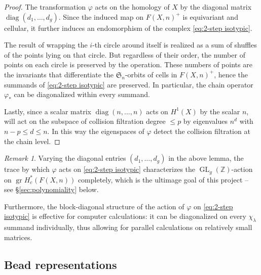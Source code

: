 \documentclass[12pt]{article}
\newcommand{\Z}{\mathbb{Z}}
\newcommand{\SymGroup}[1][n]{\mathfrak{S}_{#1}}
\newcommand{\Specht}[1]{\chi_{#1}}
\DeclareMathOperator{\GL}{GL}
\DeclareMathOperator{\gr}{gr}
\theoremstyle{plain}
\theoremstyle{definition}
\theoremstyle{remark}
\newtheorem{rmk}[thm]{Remark}
\begin{document}
\begin{proof}
    The transformation $\varphi$ acts on the homology of $X$ by the diagonal matrix $\operatorname{diag}(d_1,\ldots,d_g)$.
    Since the induced map on $F(X,n)^+$ is equivariant and cellular, it further induces an endomorphism of the complex \eqref{eq:2-step isotypic}.
    
    The result of wrapping the $i$-th circle around itself is realized as a sum of shuffles of the points lying on that circle. But regardless of their order, the number of points on each circle is preserved by the operation. These numbers of points are the invariants that differentiate the $\SymGroup$-orbits of cells in $F(X,n)^+$, hence the summands of \eqref{eq:2-step isotypic} are preserved. In particular, the chain operator $\varphi_*$ can be diagonalized within every summand.
    
    Lastly, since a scalar matrix $\operatorname{diag}(n,\ldots,n)$ acts on $H^1(X)$ by the scalar $n$, will act on the subspace of collision filtration degree $\leq p$ by eigenvalues $n^d$ with $n-p \leq d \leq n$. In this way the eigenspaces of $\varphi$ detect the collision filtration at the chain level.
\end{proof}

\begin{rmk}
 Varying the diagonal entries $(d_1,\ldots,d_g)$ in the above lemma, the trace by which $\varphi$ acts on \eqref{eq:2-step isotypic} characterizes the $\GL_g(\Z)$-action on $\gr H^*_c(F(X,n))$ completely, which is the ultimage goal of this project -- see \S\ref{sec:polynomiality} below.
 
 Furthermore, the block-diagonal structure of the action of $\varphi$ on \eqref{eq:2-step isotypic} is effective for computer calculations: it can be diagonalized on every $\Specht{\lambda}$ summand individually, thus allowing for parallel calculations on relatively small matrices.

\end{rmk}

\subsection{Bead representations}\label{sec:bead}
\end{document}
